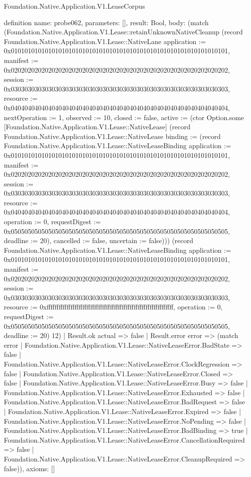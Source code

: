 \begin{lexlean}{Foundation.Native.Application.V1.LeaseCorpus}
\begin{semanticmodule}
definition{
  name: probe062,
  parameters: [],
  result: Bool,
  body: (match (Foundation.Native.Application.V1.Lease::retainUnknownNativeCleanup (record Foundation.Native.Application.V1.Lease::NativeLane {application := 0x0101010101010101010101010101010101010101010101010101010101010101, manifest := 0x0202020202020202020202020202020202020202020202020202020202020202, session := 0x0303030303030303030303030303030303030303030303030303030303030303, resource := 0x0404040404040404040404040404040404040404040404040404040404040404, nextOperation := 1, observed := 10, closed := false, active := (ctor Option.some [Foundation.Native.Application.V1.Lease::NativeLease] (record Foundation.Native.Application.V1.Lease::NativeLease {binding := (record Foundation.Native.Application.V1.Lease::NativeLeaseBinding {application := 0x0101010101010101010101010101010101010101010101010101010101010101, manifest := 0x0202020202020202020202020202020202020202020202020202020202020202, session := 0x0303030303030303030303030303030303030303030303030303030303030303, resource := 0x0404040404040404040404040404040404040404040404040404040404040404, operation := 0, requestDigest := 0x0505050505050505050505050505050505050505050505050505050505050505, deadline := 20}), cancelled := false, uncertain := false}))}) (record Foundation.Native.Application.V1.Lease::NativeLeaseBinding {application := 0x0101010101010101010101010101010101010101010101010101010101010101, manifest := 0x0202020202020202020202020202020202020202020202020202020202020202, session := 0x0303030303030303030303030303030303030303030303030303030303030303, resource := 0xffffffffffffffffffffffffffffffffffffffffffffffffffffffffffffffff, operation := 0, requestDigest := 0x0505050505050505050505050505050505050505050505050505050505050505, deadline := 20}) 12)
    | Result.ok actual => false
    | Result.error error => (match error
      | Foundation.Native.Application.V1.Lease::NativeLeaseError.BadState => false
      | Foundation.Native.Application.V1.Lease::NativeLeaseError.ClockRegression => false
      | Foundation.Native.Application.V1.Lease::NativeLeaseError.Closed => false
      | Foundation.Native.Application.V1.Lease::NativeLeaseError.Busy => false
      | Foundation.Native.Application.V1.Lease::NativeLeaseError.Exhausted => false
      | Foundation.Native.Application.V1.Lease::NativeLeaseError.BadRequest => false
      | Foundation.Native.Application.V1.Lease::NativeLeaseError.Expired => false
      | Foundation.Native.Application.V1.Lease::NativeLeaseError.NoPending => false
      | Foundation.Native.Application.V1.Lease::NativeLeaseError.BadBinding => true
      | Foundation.Native.Application.V1.Lease::NativeLeaseError.CancellationRequired => false
      | Foundation.Native.Application.V1.Lease::NativeLeaseError.CleanupRequired => false)),
  axioms: []
}


\end{semanticmodule}
\end{lexlean}
